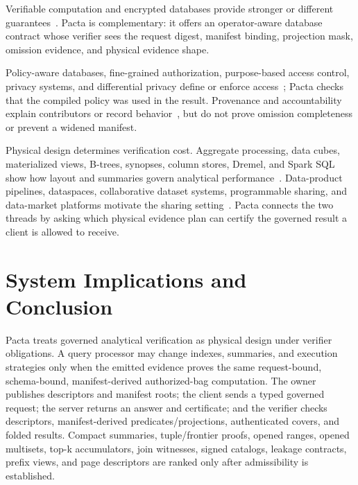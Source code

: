 \documentclass[conference]{IEEEtran}
\newcommand{\sys}{Pacta\xspace}
\begin{document}
Verifiable computation and encrypted databases provide stronger or different guarantees~\cite{benabbas2011vdelegation,setty2012pepper,parno2013pinocchio,zhang2017vsql,hacigumus2002encrypted,popa2011cryptdb,zheng2017opaque}. \sys is complementary: it offers an operator-aware database contract whose verifier sees the request digest, manifest binding, projection mask, omission evidence, and physical evidence shape.

Policy-aware databases, fine-grained authorization, purpose-based access control, privacy systems, and differential privacy define or enforce access~\cite{stonebraker1974access,agrawal2002hippocratic,agrawal2005privacy,rizvi2004fgac,kabra2006fgac,chaudhuri2007predicated,byun2008purpose,colombo2015action,sandhu1996rbac,jajodia1997multipolicy,mcsherry2009pinq,dwork2006dp,paduroiu2024sparkaccess}; \sys checks that the compiled policy was used in the result. Provenance and accountability explain contributors or record behavior~\cite{cui2000lineage,buneman2001whywhere,green2007semiring,cheney2009provenance,karvounarakis2010provenance,glavic2007categorization,herschel2017survey,glavic2021provenance,meliou2010causality,amsterdamer2011provenance,haeberlen2007peerreview}, but do not prove omission completeness or prevent a widened manifest.

Physical design determines verification cost. Aggregate processing, data cubes, materialized views, B-trees, synopses, column stores, Dremel, and Spark SQL show how layout and summaries govern analytical performance~\cite{chaudhuri1994aggregate,gray1997datacube,harinarayan1996cubes,gupta1993views,graefe2011btree,cormode2012synopses,abadi2006columnstores,melnik2010dremel,armbrust2015sparksql}. Data-product pipelines, dataspaces, collaborative dataset systems, programmable sharing, and data-market platforms motivate the sharing setting~\cite{polyzotis2017data,franklin2005dataspaces,bhardwaj2015datahub,fernandez2020datahub,pei2023markets,xia2026sharing}. \sys connects the two threads by asking which physical evidence plan can certify the governed result a client is allowed to receive.


\section{System Implications and Conclusion}
\sys treats governed analytical verification as physical design under verifier obligations. A query processor may change indexes, summaries, and execution strategies only when the emitted evidence proves the same request-bound, schema-bound, manifest-derived authorized-bag computation. The owner publishes descriptors and manifest roots; the client sends a typed governed request; the server returns an answer and certificate; and the verifier checks descriptors, manifest-derived predicates/projections, authenticated covers, and folded results. Compact summaries, tuple/frontier proofs, opened ranges, opened multisets, top-k accumulators, join witnesses, signed catalogs, leakage contracts, prefix views, and page descriptors are ranked only after admissibility is established.
\end{document}
